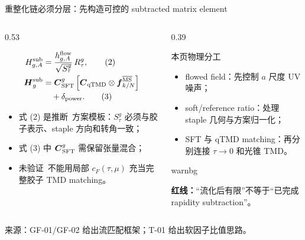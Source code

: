 \documentclass[UTF8,aspectratio=169,11pt]{ctexbeamer}
\newcommand{\source}[1]{%
  \par\vspace{0.05em}%
  {\raggedright\scriptsize\color{muted}来源：#1\par}}
\newcommand{\inferred}{\textcolor{accent}{推断}}
\newcommand{\unverified}{\textcolor{warning}{未验证}}
\begin{document}
\begin{frame}[t]{重整化链必须分层：先构造可控的 subtracted matrix element}
  \begin{columns}[T,totalwidth=\textwidth]
    \begin{column}{0.53\textwidth}
      {\footnotesize
      \begin{align*}
        H_{g,A}^{\rm sub}
        &=
        \frac{h_{g,A}^{\rm flow}}{\sqrt{S_{\tau}^{g}}}\,
        R_{\tau}^{g}, \tag{2}\\
        \boldsymbol H_g^{\rm sub}
        &=
        \boldsymbol C_{\rm SFT}^{g}
        \left[\boldsymbol C_{\rm qTMD}
        \otimes \boldsymbol f_{k/N}^{\overline{\rm MS}}\right]\\[-0.2em]
        &\quad+\delta_{\rm power}. \tag{3}
      \end{align*}
      \begin{itemize}
        \setlength{\itemsep}{0.15em}
        \item 式 (2) 是\inferred\ 方案模板：$S_\tau^g$ 必须与胶子表示、staple 方向和转角一致；
        \item 式 (3) 中 $\boldsymbol C_{\rm SFT}^{g}$ 需保留张量混合；
        \item \unverified\ 不能用局部 $c_F(\tau,\mu)$ 充当完整胶子 TMD matching。
      \end{itemize}\par}
    \end{column}
    \begin{column}{0.39\textwidth}
      \begin{block}{本页物理分工}
        {\footnotesize
        \begin{itemize}
          \setlength{\itemsep}{0.12em}
          \item flowed field：先控制 $a$ 尺度 UV 噪声；
          \item soft/reference ratio：处理 staple 几何与方案归一化；
          \item SFT 与 qTMD matching：再分别连接 $\tau\to0$ 和光锥 TMD。\par
        \end{itemize}}
      \end{block}
      \begin{beamercolorbox}[wd=\linewidth,sep=0.5em,rounded=true]{warnbg}
        {\footnotesize
        \textbf{红线：}“流化后有限”不等于“已完成 rapidity subtraction”。\par}
      \end{beamercolorbox}
    \end{column}
  \end{columns}
  \source{GF-01/GF-02 给出流匹配框架；T-01 给出软因子比值思路。}
\end{frame}
\end{document}
